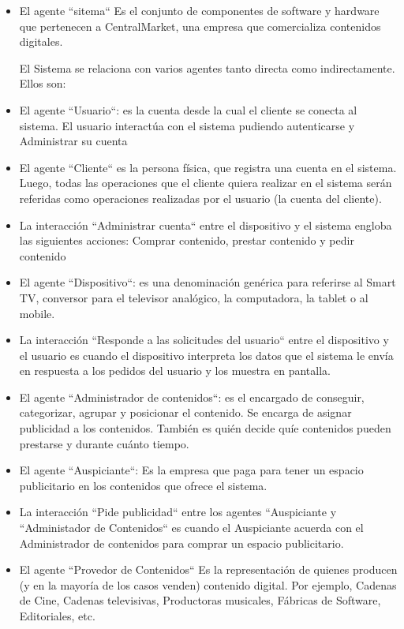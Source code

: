 \documentclass[11pt, a4paper, spanish]{article}
\begin{document}
\begin{itemize}

\item  {El agente ``sitema`` Es el conjunto de componentes de software y hardware que pertenecen a CentralMarket, una empresa que comercializa contenidos digitales.}

El Sistema se relaciona con varios agentes tanto directa como indirectamente. Ellos son:

\item El agente ``Usuario``: es la cuenta desde la cual el cliente se conecta al sistema. El usuario interact\'ua con el sistema pudiendo autenticarse y Administrar su cuenta
\item El agente ``Cliente`` es la persona f\'isica, que registra una cuenta en el sistema. Luego, todas las operaciones que el cliente quiera realizar en el sistema ser\'an referidas como operaciones realizadas por el usuario (la cuenta del cliente).
\item La interacci\'on ``Administrar cuenta`` entre el dispositivo y el sistema engloba las siguientes acciones: Comprar contenido, prestar contenido y pedir contenido

\item El agente ``Dispositivo``: es una denominaci\'on gen\'erica para referirse al Smart TV, conversor para el televisor anal\'ogico, la computadora, la tablet o al mobile. 
\item La interacci\'on ``Responde a las solicitudes del usuario`` entre el dispositivo y el usuario es cuando el dispositivo interpreta los datos que el sistema le env\'ia en respuesta a los pedidos del usuario y los muestra en pantalla.	 
   
\item El agente ``Administrador de contenidos``: es el encargado de conseguir, categorizar, agrupar y posicionar el contenido. Se encarga de asignar publicidad a los contenidos. Tambi\'en es qui\'en decide qu\'ie contenidos pueden prestarse y durante cu\'anto tiempo.

\item El agente ``Auspiciante``: Es la empresa que paga para tener un espacio publicitario en los contenidos que ofrece el sistema.
\item La interacci\'on ``Pide publicidad`` entre los agentes ``Auspiciante y ``Administador de Contenidos`` es cuando el Auspiciante acuerda con el Administrador de contenidos para comprar un espacio publicitario.
      
\item El agente ``Provedor de Contenidos`` Es la representaci\'on de quienes producen (y en la mayor\'ia de los casos venden) contenido digital. Por ejemplo, Cadenas de Cine, Cadenas televisivas, Productoras musicales, F\'abricas de Software, Editoriales, etc. 


\end{itemize}
\end{document}
